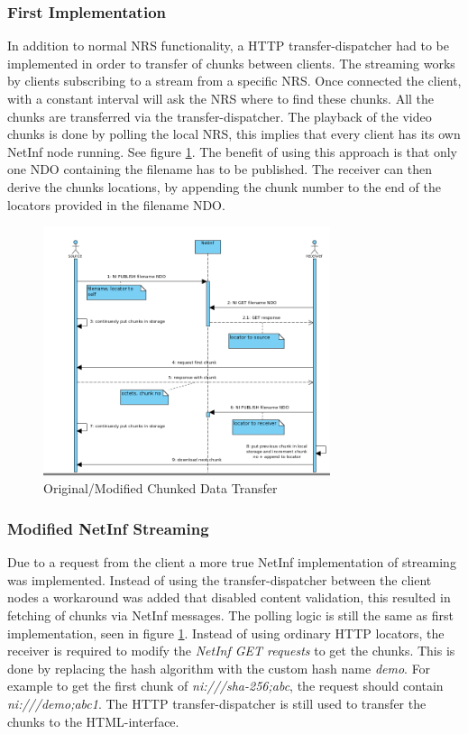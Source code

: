 \subsubsection{First Implementation}
In addition to normal NRS functionality, a HTTP transfer-dispatcher had to be implemented in order to transfer of chunks between clients. The streaming works by clients subscribing to a stream from a specific NRS. Once connected the client, with a constant interval will ask the NRS where to find these chunks. All the chunks are transferred via the transfer-dispatcher.
The playback of the video chunks is done by polling the local NRS, this implies that every client has its own NetInf node running. See figure \ref{fig:stream-seqorgmod}. The benefit of using this approach is that only one NDO containing the filename has to be published. The receiver can then derive the chunks locations, by appending the chunk number to the end of the locators provided in the filename NDO.

\begin{figure}[h!]
	\centering
		\includegraphics[width=0.75\textwidth]{./img/sequence_diagram_streaming_orgmod.png}
    	\caption{Original/Modified Chunked Data Transfer}
	\label{fig:stream-seqorgmod}
\end{figure}

\subsubsection{Modified NetInf Streaming}
Due to a request from the client a more true NetInf implementation of streaming was implemented. Instead of using the transfer-dispatcher between the client nodes a workaround was added that disabled content validation, this resulted in fetching of chunks via NetInf messages. The polling logic is still the same as first implementation, seen in figure \ref{fig:stream-seqorgmod}. Instead of using ordinary HTTP locators, the receiver is required to modify the \textit{NetInf GET requests} to get the chunks. This is done by replacing the hash algorithm with the custom hash name \textit{demo}. For example to get the first chunk of \textit{ni:///sha-256;abc}, the request should contain \textit{ni:///demo;abc1}. The HTTP transfer-dispatcher is still used to transfer the chunks to the HTML-interface.

